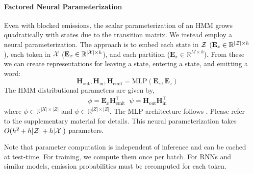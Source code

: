 \documentclass[11pt,a4paper]{article}
\begin{document}


\paragraph{Factored Neural Parameterization}

Even with blocked emissions, the scalar parameterization of an HMM grows quadratically
with states due to the transition matrix.
We instead employ a neural parameterization.
The approach is to embed each state in $\cal Z$ ($\mathbf{E}_z \in \mathbb{R}^{|\mathcal{Z}| \times h}$),
each token in $\cal X$ ($\mathbf{E}_x \in \mathbb{R}^{|\mathcal{X}| \times h}$),
and each partition ($\mathbf{E}_\pi \in \mathbb{R}^{M \times h}$).
From these we can create representations for leaving a state, entering a state,
and emitting a word: 
\[ \mathbf{H}_{\textrm{out}},\mathbf{H}_{\textrm{in}},\mathbf{H}_\textrm{emit}
 = \text{MLP}(\mathbf{E}_\pi, \mathbf{E}_z ) \] 
The HMM distributional parameters are given by,
\begin{equation}
\begin{aligned}
\phi = \mathbf{E}_x \mathbf{H}_\textrm{emit}^\top \;\; 
\psi = \mathbf{H}_\textrm{out} \mathbf{H}_\textrm{in}^\top
\end{aligned}
\end{equation}
where $\phi \in \mathbb{R}^{|X|\times|Z|}$ and
$\psi \in \mathbb{R}^{|Z|\times|Z|}$.
The MLP architecture follows \cite{kim2019cpcfg}.
Please refer to the supplementary material for details. 
This neural parameterization takes $O(h^2 + h|\mathcal{Z}| + h|\mathcal{X}|)$ parameters.


Note that parameter computation is independent of inference and can be cached at test-time.
For training, we compute them once per batch. 
For RNNs and similar models, %
emission probabilities must be recomputed for each token. 
\end{document}
